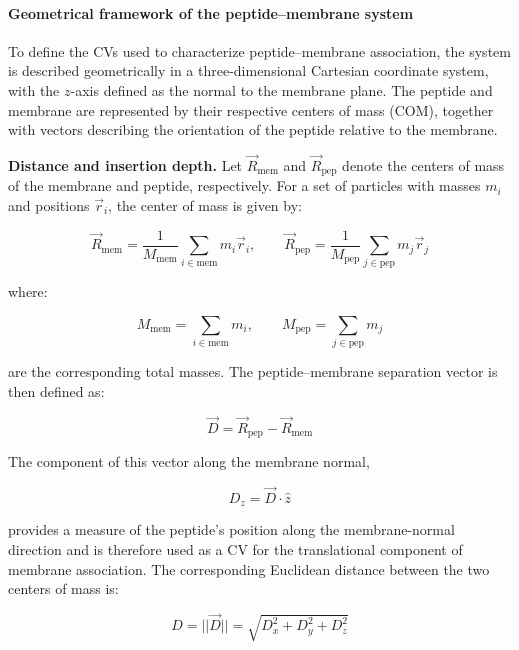 \paragraph{Geometrical framework of the peptide--membrane system}

To define the CVs used to characterize peptide--membrane association, the system is described geometrically in a three-dimensional Cartesian coordinate system, with the $z$-axis defined as the normal to the membrane plane. The peptide and membrane are represented by their respective centers of mass (COM), together with vectors describing the orientation of the peptide relative to the membrane.

\textbf{Distance and insertion depth.} Let $\vec{R}_{\mathrm{mem}}$ and $\vec{R}_{\mathrm{pep}}$ denote the centers of mass of the membrane and peptide, respectively. For a set of particles with masses $m_i$ and positions $\vec{r}_i$, the center of mass is given by:

\begin{equation}
\vec{R}_{\mathrm{mem}} = \frac{1}{M_{\mathrm{mem}}} \sum_{i\in\mathrm{mem}} m_i\vec{r}_i,
\qquad
\vec{R}_{\mathrm{pep}} = \frac{1}{M_{\mathrm{pep}}} \sum_{j\in\mathrm{pep}} m_j\vec{r}_j
\end{equation}

where:

\begin{equation}
M_{\mathrm{mem}}=\sum_{i\in\mathrm{mem}}m_i,
\qquad
M_{\mathrm{pep}}=\sum_{j\in\mathrm{pep}}m_j
\end{equation}

are the corresponding total masses. The peptide--membrane separation vector is then defined as:

\begin{equation}
\vec{D} = \vec{R}_{\mathrm{pep}} - \vec{R}_{\mathrm{mem}}
\end{equation}

The component of this vector along the membrane normal,

\begin{equation}
D_z = \vec{D}\cdot\hat{z}
\end{equation}

provides a measure of the peptide's position along the membrane-normal direction and is therefore used as a CV for the translational component of membrane association. The corresponding Euclidean distance between the two centers of mass is:

\begin{equation}
D = ||\vec{D}|| = \sqrt{D_x^2+D_y^2+D_z^2}
\end{equation}

